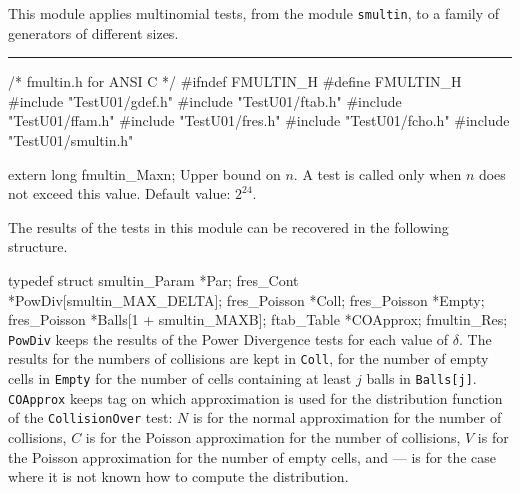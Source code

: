 
This module applies multinomial tests, from the module {\tt smultin},
to a family of generators of different sizes.

\iffalse  %
There are different functions to choose the different parameters for the
 tests. The dimension $t$ and the interval length $d$ are mutually exclusive:
 we fix one of them and the other will be chosen by the program.
 Usually, we fix the dimension $t$,
and the interval $d$ will be chosen by one of the function {\tt Choose\_d}.
We may also fix the interval $d$, and then one of the function
 {\tt Choose\_t} will select a value of $t$.
\fi  %


\bigskip
\hrule
\code\hide
/* fmultin.h for ANSI C */
#ifndef FMULTIN_H
#define FMULTIN_H
\endhide
#include "TestU01/gdef.h"
#include "TestU01/ftab.h"
#include "TestU01/ffam.h"
#include "TestU01/fres.h"
#include "TestU01/fcho.h"
#include "TestU01/smultin.h"


extern long fmultin_Maxn;
\endcode
\tab
  Upper bound on $n$.
  A test is called only when $n$ does not exceed this value.
  Default value: $2^{24}$.
\endtab

\ifdetailed %


The results of the tests in this module can be recovered
in the following structure.

\code

typedef struct {
   smultin_Param *Par;
   fres_Cont *PowDiv[smultin_MAX_DELTA];
   fres_Poisson *Coll;
   fres_Poisson *Empty;
   fres_Poisson *Balls[1 + smultin_MAXB];
   ftab_Table *COApprox;
} fmultin_Res;
\endcode
\tab
  {\tt PowDiv} keeps the results of the Power Divergence tests for each
  value of $\delta$. The results for the numbers of collisions are kept in
  {\tt Coll}, for the number of empty cells in {\tt Empty} for the number of
  cells containing at least $j$ balls in  {\tt Balls[j]}.
  {\tt COApprox} keeps tag on which approximation is used for the
  distribution function of the {\tt CollisionOver} test:
  $N$ is for the normal approximation for the number of collisions,
  $C$ is for the Poisson approximation for the number of collisions,
  $V$ is for the Poisson approximation for the number of empty cells, and
  --- is for the case where it is not known how to compute the distribution.
\endtab
\code


